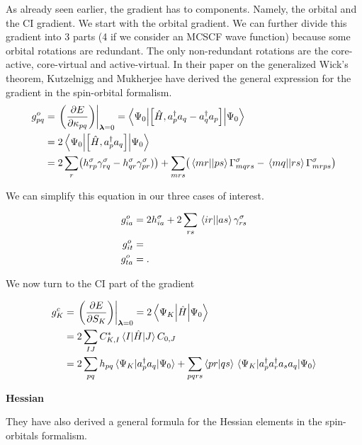 \documentclass[11pt,a4paper]{article}
\newcommand{\hH}{\Hat{H}} %
\newcommand{\cre}[1]{a_{#1}^\dagger} %
\newcommand{\ani}[1]{a_{#1}} %
\newcommand{\eri}[2]{\braket{#1}{#2}} %
\newcommand{\com}[2]{\mleft[#1,#2 \mright]}
\begin{document}
As already seen earlier, the gradient has to components. Namely, the orbital and the CI gradient.
We start with the orbital gradient. We can further divide this gradient into 3 parts (4 if we consider an MCSCF wave function) because some orbital rotations are redundant.
The only non-redundant rotations are the core-active, core-virtual and active-virtual.
In their paper on the generalized Wick's theorem, Kutzelnigg and Mukherjee have derived the general expression for the gradient in the spin-orbital formalism.
\begin{align}
  \label{eq:MCSCF_SO_Orb_Gradient}
  g^o_{pq} &= \evalat*{\mleft(\pdv{E}{\kappa_{pq}}\mright)}{\bm{\lambda}=0} = \mel**{\Psi_0}{\com{\hH}{\cre{p}\ani{q} - \cre{q}\ani{p}}}{\Psi_0} \\
           &= 2\mel**{\Psi_0}{\com{\hH}{\cre{p}\ani{q}}}{\Psi_0} \notag \\
  &= 2 \sum_r\mleft(h_{rp}^{\sigma}\gamma_{rq}^{\sigma}-h_{qr}^{\sigma}\gamma_{pr}^{\sigma})\mright) + \sum_{mrs}\mleft(\mel{mr}{}{ps}\Gamma_{mqrs}^\sigma - \mel{mq}{}{rs}\Gamma_{mrps}^\sigma \mright) 
\end{align}

We can simplify this equation in our three cases of interest.

\begin{subequations}
  \label{eq:MCSCF_SO_Orb_Gradient}
  \begin{align}
    g^o_{ia} &= 2h_{ia}^\sigma + 2\sum_{rs}\mel{ir}{}{as}\gamma_{rs}^\sigma\\
    g^o_{it} &= \\
    g^o_{ta} &= .
  \end{align}
\end{subequations}

We now turn to the CI part of the gradient

\begin{align}
  \label{eq:MCSCF_CI_Gradient}
  g^c_{K} &= \evalat*{\mleft(\pdv{E}{S_{K}}\mright)}{\bm{\lambda}=0} = 2\mel**{\Psi_K}{\hH}{\Psi_0} \\
          &= 2\sum_{IJ}C_{K,I}^*\mel{I}{\hH}{J}C_{0,J} \notag \\
          &= 2\sum_{pq}h_{pq}\mel{\Psi_K}{\cre{p}\ani{q}}{\Psi_0} + \sum_{pqrs}\eri{pr}{qs}\mel{\Psi_K}{\cre{p}\cre{r}\ani{s}\ani{q}}{\Psi_0}
\end{align}

\noindent\textbf{Hessian}

They have also derived a general formula for the Hessian elements in the spin-orbitals formalism.
\end{document}
